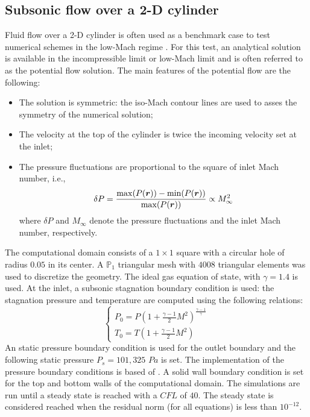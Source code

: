 \subsection{Subsonic flow over a 2-D cylinder} \label{sec:cylinder}
Fluid flow over a 2-D cylinder is often used as a benchmark case to test numerical schemes in the low-Mach regime \cite{LowMach1, LowMach2, LowMach3}. For this test, an analytical solution is available in the incompressible limit or low-Mach limit and is often referred to as the potential flow solution. The main features of the potential flow are the following:
%
\begin{itemize}
\item The solution is symmetric: the iso-Mach contour lines are used to asses the symmetry of the numerical solution;
\item The velocity at the top of the cylinder is twice the incoming velocity set at the inlet;
\item The pressure fluctuations are proportional to the square of inlet Mach number, i.e., 
\begin{equation}
\delta P = \frac{\max(P(\boldsymbol r)) - \min(P(\boldsymbol r))}{\max(P(\boldsymbol r))}  \propto M_\infty^2
\end{equation}
where $\delta P$ and $M_\infty$ denote the pressure fluctuations and the inlet Mach number, respectively.
\end{itemize}
%
The computational domain consists of a $1\times 1$ square with a circular hole of radius $0.05$ in its center. A $\mathbb{P}_1$ triangular mesh with $4008$ triangular elements was used to discretize the geometry. The ideal gas equation of state, with $\gamma=1.4$ is used. At the inlet, a subsonic stagnation boundary condition is used: the stagnation pressure and temperature are computed using the following relations:
%
\begin{equation}
\label{eq:stagnation_relations}
\left\{
\begin{array}{l}
P_0 = P\left( 1 + \frac{\gamma-1}{2} M^2 \right)^{\frac{\gamma-1}{\gamma}} \\
T_0 = T\left( 1 + \frac{\gamma-1}{2} M^2 \right)
\end{array}
\right.
\end{equation}
%
An static pressure boundary condition is used for the outlet boundary and the following static pressure $P_s = 101,325$ $Pa$ is set. The implementation of the pressure boundary conditions is based of \cite{SEM}. A solid wall boundary condition is set for the top and bottom walls of the computational domain. The simulations are run until a steady state is reached with a $CFL$ of $40$. The steady state is considered reached when the residual norm  (for all equations) is less than $10^{-12}$.

